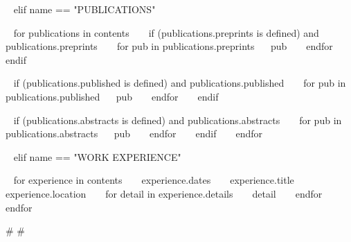 \begin{minipage}{\textwidth}
~{ elif name == "PUBLICATIONS" }~
\begin{entrylist}

~{ for publications in contents }~
  ~{ if (publications.preprints is defined) and publications.preprints }~
    ~{ for pub in publications.preprints}~
    \entry
      {}
      {~{{ pub }}~}
      {}
      {}
    ~{ endfor }~
  ~{ endif }~

  ~{ if (publications.published is defined) and publications.published }~
    ~{ for pub in publications.published}~
    \entry
      {}
      {~{{ pub }}~}
      {}
      {}
    ~{ endfor }~
  ~{ endif }~

  ~{ if (publications.abstracts is defined) and publications.abstracts }~
    ~{ for pub in publications.abstracts}~
    \entry
      {}
      {~{{ pub }}~}
      {}
      {}
    ~{ endfor }~
  ~{ endif }~
~{ endfor }~

\end{entrylist}



~{ elif name == "WORK EXPERIENCE" }~
\begin{entrylist}
~{ for experience in contents }~
  \entry
    {~{{ experience.dates }}~}
    {~{{ experience.title }}~}
    {~{{ experience.location }}~}
    {~{ for detail in experience.details }~ ~{{ detail }}~ ~{ endfor }~}
~{ endfor }~
\end{entrylist}

{#
#}
  


\end{minipage}
